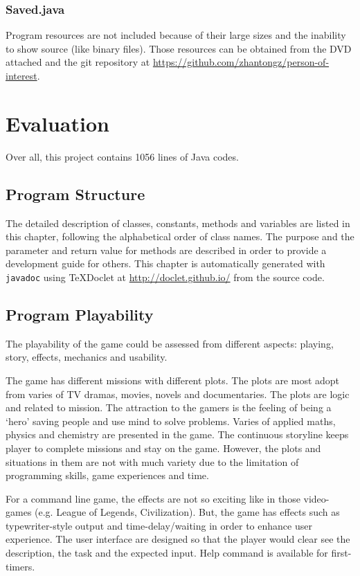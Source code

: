\documentclass[letterpaper, 12pt]{report}
\begin{document}
\section{Saved.java}


Program resources are not included because of their large sizes and the inability to show source (like binary files). Those resources can be obtained from the DVD attached and the git repository at \url{https://github.com/zhantongz/person-of-interest}.

\part{Evaluation}
Over all, this project contains 1056 lines of Java codes.
\chapter{Program Structure}
The detailed description of classes, constants, methods and variables are listed in this chapter, following the alphabetical order of class names. The purpose and the parameter and return value for methods are described in order to provide a development guide for others. This chapter is automatically generated with \texttt{javadoc} using TeXDoclet at \url{http://doclet.github.io/} from the source code.

\chapter{Program Playability}
The playability of the game could be assessed from different aspects: playing, story, effects, mechanics and usability.

The game has different missions with different plots. The plots are most adopt from varies of TV dramas, movies, novels and documentaries. The plots are logic and related to mission. The attraction to the gamers is the feeling of being a `hero' saving people and use mind to solve problems. Varies of applied maths, physics and chemistry are presented in the game. The continuous storyline keeps player to complete missions and stay on the game. However, the plots and situations in them are not with much variety due to the limitation of programming skills, game experiences and time.

For a command line game, the effects are not so exciting like in those video-games (e.g. League of Legends, Civilization). But, the game has effects such as typewriter-style output and time-delay/waiting in order to enhance user experience. The user interface are designed so that the player would clear see the description, the task and the expected input. Help command is available for first-timers.
\end{document}
